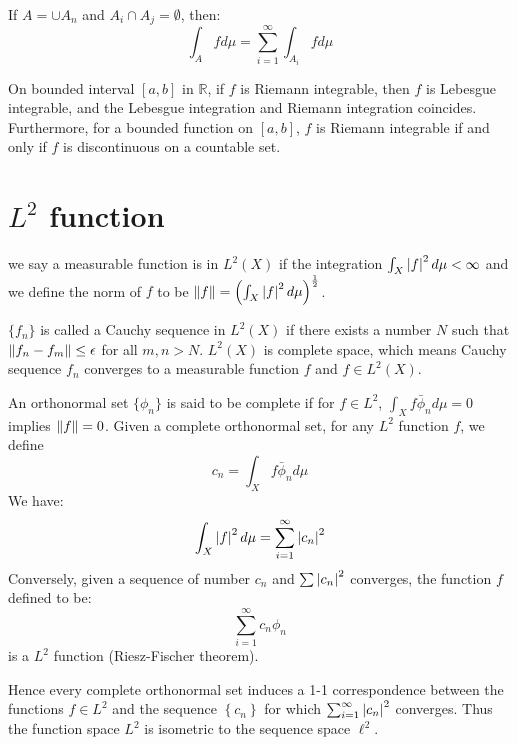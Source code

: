 \begin{theorem}
    If $A=\cup A_n$ and $A_i\cap A_j=\emptyset$, then:
    \begin{equation*}
        \int_{A}{fd\mu}=\sum_{i=1}^\infty\int_{A_i}{fd\mu}
    \end{equation*}
\end{theorem}
On bounded interval $[a,b]$ in $\mathbb{R}$, if $f$ is Riemann integrable, then $f$ is Lebesgue integrable, and the Lebesgue integration and Riemann integration coincides. Furthermore, for a bounded function on $[a,b]$, $f$ is Riemann integrable if and only if $f$ is discontinuous on a countable set.\par
\section{$L^2$ function}
we say a measurable function is in $L^2(X)$ if the integration $\int_{X}{\left\lvert f\right\rvert^2d\mu}<\infty$ and we define the norm of $f$ to be $\lVert f\rVert=\left( \int_{X}{\left\lvert f\right\rvert^2d\mu} \right)^{\frac{1}{2}}$.\par
$\{f_n\}$ is called a Cauchy sequence in $L^2(X)$ if there exists a number $N$ such that $\lVert f_n-f_m\rVert\leq \epsilon$ for all $m,n>N$. $L^2(X)$ is complete space, which means Cauchy sequence $f_n$ converges to a measurable function $f$ and $f\in L^2(X)$.\par
An orthonormal set $\{\phi_n\}$ is said to be complete if for $f\in L^2$, $\int_{X}{f\bar{\phi}_n d\mu}=0$ implies $\lVert f\rVert=0$. Given a complete orthonormal set, for any $L^2$ function $f$, we define
\begin{equation*}
    c_n=\int_{X}{f\bar{\phi}_n d\mu}
\end{equation*}
We have:
\begin{equation*}
    \int_{X}{\left\lvert f\right\rvert^2d\mu}=\sum_{i=1}^\infty\left\lvert c_n\right\rvert^2
\end{equation*}
Conversely, given a sequence of number $c_n$ and $\sum\left\lvert c_n\right\rvert^2$ converges, the function $f$ defined to be:
\begin{equation*}
    \sum_{i=1}^\infty c_n\phi_n
\end{equation*}
is a $L^2$ function (Riesz-Fischer theorem).\par
Hence every complete orthonormal set induces a 1-1 correspondence between the functions $f\in L^2$ and the sequence $\left\{ c_n\right\}$ for which $\sum_{i=1}^\infty\left\lvert c_n\right\rvert^2$ converges. Thus the function space $L^2$ is isometric to the sequence space $\ell^2$.
% 

